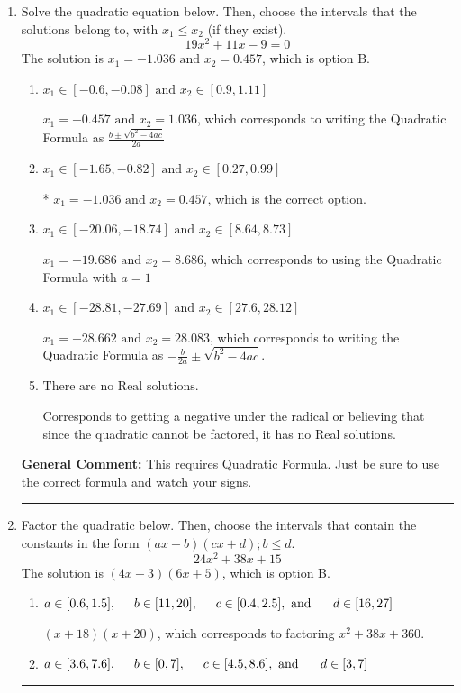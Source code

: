 \documentclass{extbook}[14pt]
\newcommand{\litem}[1]{\item #1

\rule{\textwidth}{0.4pt}}
\begin{document}
\begin{enumerate}\litem{
Solve the quadratic equation below. Then, choose the intervals that the solutions belong to, with $x_1 \leq x_2$ (if they exist).
\[ 19x^{2} +11 x -9 = 0 \]The solution is \( x_1 = -1.036 \text{ and } x_2 = 0.457 \), which is option B.\begin{enumerate}[label=\Alph*.]
\item \( x_1 \in [-0.6, -0.08] \text{ and } x_2 \in [0.9, 1.11] \)

 $x_1 = -0.457 \text{ and } x_2 = 1.036$, which corresponds to writing the Quadratic Formula as $\frac{b \pm \sqrt{b^2 - 4ac}}{2a}$
\item \( x_1 \in [-1.65, -0.82] \text{ and } x_2 \in [0.27, 0.99] \)

* $x_1 = -1.036 \text{ and } x_2 = 0.457$, which is the correct option.
\item \( x_1 \in [-20.06, -18.74] \text{ and } x_2 \in [8.64, 8.73] \)

 $x_1 = -19.686 \text{ and } x_2 = 8.686$, which corresponds to using the Quadratic Formula with $a=1$
\item \( x_1 \in [-28.81, -27.69] \text{ and } x_2 \in [27.6, 28.12] \)

 $x_1 = -28.662 \text{ and } x_2 = 28.083$, which corresponds to writing the Quadratic Formula as $-\frac{b}{2a} \pm \sqrt{b^2 - 4ac}$.
\item \( \text{There are no Real solutions.} \)

Corresponds to getting a negative under the radical or believing that since the quadratic cannot be factored, it has no Real solutions.
\end{enumerate}

\textbf{General Comment:} This requires Quadratic Formula. Just be sure to use the correct formula and watch your signs.
}
\litem{
Factor the quadratic below. Then, choose the intervals that contain the constants in the form $(ax+b)(cx+d); b \leq d.$
\[ 24x^{2} +38 x + 15 \]The solution is \( (4x + 3)(6x + 5) \), which is option B.\begin{enumerate}[label=\Alph*.]
\item \( a \in [0.6, 1.5], \hspace*{5mm} b \in [11, 20], \hspace*{5mm} c \in [0.4, 2.5], \text{ and } \hspace*{5mm} d \in [16, 27] \)

 $(x + 18)(x + 20)$, which corresponds to factoring $x^{2} +38 x + 360$.
\item \( a \in [3.6, 7.6], \hspace*{5mm} b \in [0, 7], \hspace*{5mm} c \in [4.5, 8.6], \text{ and } \hspace*{5mm} d \in [3, 7] \)


\end{enumerate}}
\end{enumerate}
\end{document}
